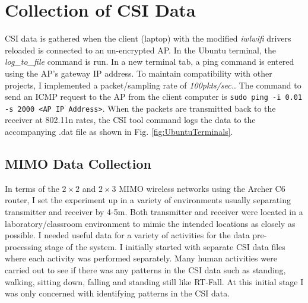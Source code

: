 \section{Collection of CSI Data}
CSI data is gathered when the client (laptop) with the modified \textit{iwlwifi} drivers reloaded is connected to an un-encrypted AP. In the Ubuntu terminal, the \textit{log\_to\_file} command is run. In a new terminal tab, a ping command is entered using the AP's gateway IP address. To maintain compatibility with other projects, I implemented a packet/sampling rate of \textit{100pkts/sec.}. The command to send an ICMP request to the AP from the client computer is \lstinline{sudo ping -i 0.01 -s 2000 <AP IP Address>}. When the packets are transmitted back to the receiver at 802.11n rates, the CSI tool command logs the data to the accompanying .dat file as shown in Fig. \ref{fig:UbuntuTerminals}.
\subsection{MIMO Data Collection}
In terms of the $2\times 2$ and $2\times 3$ MIMO wireless networks using the Archer C6 router, I set the experiment up in a variety of environments usually separating transmitter and receiver by 4-5m. Both transmitter and receiver were located in a laboratory/classroom environment to mimic the intended locations as closely as possible. I needed useful data for a variety of activities for the data pre-processing stage of the system. I initially started with separate CSI data files where each activity was performed separately. Many human activities were carried out to see if there was any patterns in the CSI data such as standing, walking, sitting down, falling and standing still like RT-Fall. At this initial stage I was only concerned with identifying patterns in the CSI data. 
\begin{comment}In the future, I will need to devise an experiment which gathers 10+ minutes of real-life data from an environment such as a living room to identify consecutive human activities. This would provide a more accurate representation of how the channel changes due to consecutive human movements and lead to a more robust data processing and activity segmentation process.\end{comment}
